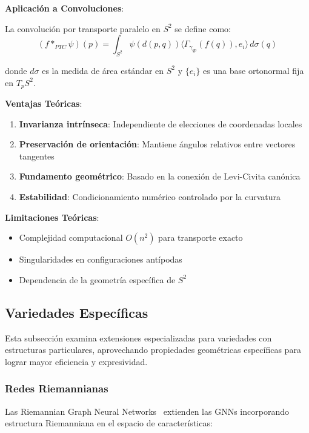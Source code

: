 \begin{example}
\textbf{Aplicación a Convoluciones}:

La convolución por transporte paralelo en $S^2$ se define como:
\begin{equation}
(f *_{PTC} \psi)(p) = \int_{S^2} \psi(d(p,q)) \langle \Gamma_{\gamma_{qp}}(f(q)), e_i \rangle \, d\sigma(q)
\end{equation}

donde $d\sigma$ es la medida de área estándar en $S^2$ y $\{e_i\}$ es una base ortonormal fija en $T_p S^2$.

\textbf{Ventajas Teóricas}:
\begin{enumerate}
    \item \textbf{Invarianza intrínseca}: Independiente de elecciones de coordenadas locales
    \item \textbf{Preservación de orientación}: Mantiene ángulos relativos entre vectores tangentes
    \item \textbf{Fundamento geométrico}: Basado en la conexión de Levi-Civita canónica
    \item \textbf{Estabilidad}: Condicionamiento numérico controlado por la curvatura
\end{enumerate}

\textbf{Limitaciones Teóricas}:
\begin{itemize}
    \item Complejidad computacional $O(n^2)$ para transporte exacto
    \item Singularidades en configuraciones antípodas
    \item Dependencia de la geometría específica de $S^2$
\end{itemize}
\end{example}

\subsection{Variedades Específicas}\label{subsec:variedades_especificas}

Esta subsección examina extensiones especializadas para variedades con estructuras particulares, aprovechando propiedades geométricas específicas para lograr mayor eficiencia y expresividad.

\subsubsection{Redes Riemannianas}

Las Riemannian Graph Neural Networks~\citep{gu2021riemanniangraph} extienden las GNNs incorporando estructura Riemanniana en el espacio de características:

